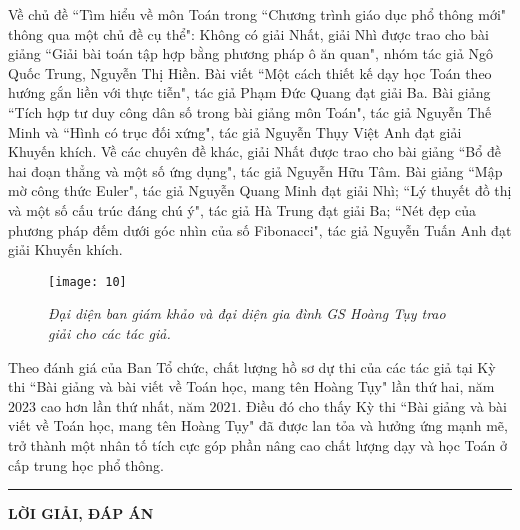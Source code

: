 \begin{multicols}{2}
	\vskip 0.1cm
	Về chủ đề ``Tìm hiểu về môn Toán trong ``Chương trình giáo dục phổ thông mới" thông qua một chủ đề cụ thể": Không có giải Nhất, giải Nhì được trao cho bài giảng ``Giải bài toán tập hợp bằng phương pháp ô ăn quan", nhóm tác giả Ngô Quốc Trung, Nguyễn Thị Hiền. Bài viết ``Một cách thiết kế dạy học Toán theo hướng gắn liền với thực tiễn", tác giả Phạm Đức Quang đạt giải Ba. Bài giảng ``Tích hợp tư duy công dân số trong bài giảng môn Toán", tác giả Nguyễn Thế Minh và ``Hình có trục đối xứng", tác giả Nguyễn Thụy Việt Anh đạt giải Khuyến khích. 
	\vskip 0.1cm
	Về các chuyên đề khác, giải Nhất được trao cho bài giảng ``Bổ đề hai đoạn thẳng và một số ứng dụng", tác giả Nguyễn Hữu Tâm. Bài giảng ``Mập mờ công thức Euler", tác giả Nguyễn Quang Minh đạt giải Nhì; ``Lý thuyết đồ thị và một số cấu trúc đáng chú ý", tác giả Hà Trung đạt giải Ba; ``Nét đẹp của phương pháp đếm dưới góc nhìn của số Fibonacci", tác giả Nguyễn Tuấn Anh đạt giải Khuyến khích. 
	\end{multicols}
	\begin{figure}[H]
		\vspace*{5pt}
		\centering
		\captionsetup{labelformat= empty, justification=centering}
		\texttt{[image: 10]}
		\caption{\small\textit{\color{doisongtoanhoc}Đại diện ban giám khảo và đại diện gia đình GS Hoàng Tụy trao giải cho các tác giả.}}
		\vspace*{-10pt}
	\end{figure}
	\begin{multicols}{2}
	Theo đánh giá của Ban Tổ chức, chất lượng hồ sơ dự thi của các tác giả tại Kỳ thi ``Bài giảng và bài viết về Toán học, mang tên Hoàng Tụy" lần thứ hai, năm $2023$ cao hơn lần thứ nhất, năm $2021$. Điều đó cho thấy Kỳ thi ``Bài giảng và bài viết về Toán học, mang tên Hoàng Tụy" đã được lan tỏa và hưởng ứng mạnh mẽ, trở thành một nhân tố tích cực góp phần nâng cao chất lượng dạy và học Toán ở cấp trung học phổ thông. 
\end{multicols}
\vspace*{-10pt}
{\color{doisongtoanhoc}\rule{1\linewidth}{0.1pt}}
\vskip 0.2cm
{\centerline{\LARGE\textbf{\color{doisongtoanhoc}LỜI GIẢI, ĐÁP ÁN}}}
